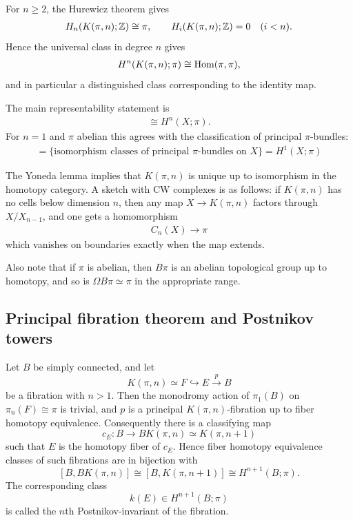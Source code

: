 \documentclass[12pt]{article}
\begin{document}
For $n \ge 2$, the Hurewicz theorem gives
\begin{align*}
    H_n(K(\pi,n);\mathbb{Z}) \cong \pi,
    \qquad
    H_i(K(\pi,n);\mathbb{Z})=0 \quad (i<n).
\end{align*}
Hence the universal class in degree $n$ gives
\begin{align*}
    H^n(K(\pi,n);\pi) \cong \operatorname{Hom}(\pi,\pi),
\end{align*}
and in particular a distinguished class corresponding to the identity map.

The main representability statement is
\begin{align*}
    [X,K(\pi,n)] \cong H^n(X;\pi).
\end{align*}
For $n=1$ and $\pi$ abelian this agrees with the classification of principal $\pi$-bundles:
\begin{align*}
    [X,B\pi]
    = \{\text{isomorphism classes of principal } \pi\text{-bundles on }X\}
    = H^1(X;\pi)
\end{align*}


The Yoneda lemma implies that $K(\pi,n)$ is unique up to isomorphism in the homotopy category.
A sketch with CW complexes is as follows: if $K(\pi,n)$ has no cells below dimension $n$, then any map $X \to K(\pi,n)$ factors through $X/X_{n-1}$, and one gets a homomorphism
\begin{align*}
    C_n(X) \to \pi
\end{align*}
which vanishes on boundaries exactly when the map extends.

Also note that if $\pi$ is abelian, then $B\pi$ is an abelian topological group up to homotopy, and so is $\Omega B\pi \simeq \pi$ in the appropriate range.

\subsection{Principal fibration theorem and Postnikov towers}
\begin{theorem}
Let $B$ be simply connected, and let
\[
K(\pi,n)\simeq F \hookrightarrow E \xrightarrow{p} B
\]
be a fibration with $n>1$. Then the monodromy action of $\pi_1(B)$ on
$\pi_n(F)\cong \pi$ is trivial, and $p$ is a principal $K(\pi,n)$-fibration
up to fiber homotopy equivalence. Consequently there is a classifying map
\[
c_E : B \to BK(\pi,n)\simeq K(\pi,n+1)
\]
such that $E$ is the homotopy fiber of $c_E$. Hence fiber homotopy equivalence
classes of such fibrations are in bijection with
\[
[B,BK(\pi,n)] \cong [B,K(\pi,n+1)] \cong H^{n+1}(B;\pi).
\]
The corresponding class
\[
k(E)\in H^{n+1}(B;\pi)
\]
is called the $n$th Postnikov-invariant of the fibration.
\end{theorem}
\end{document}

